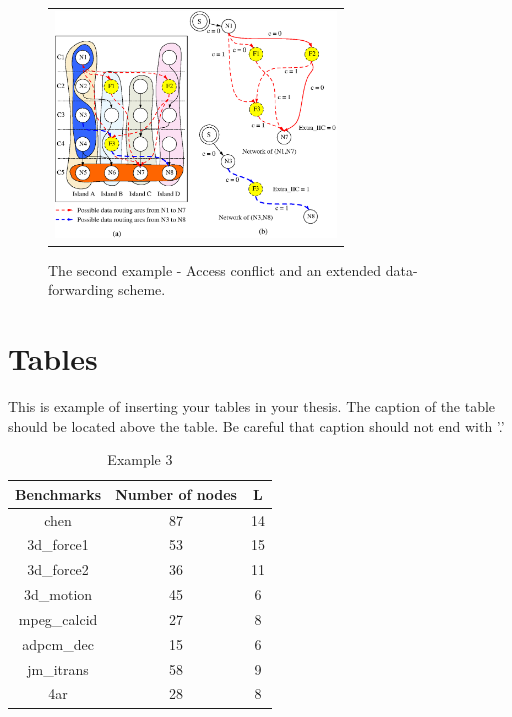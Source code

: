 \documentclass[doctor]{snuee}
\begin{document}
\begin{figure}[htbp]
	{
		\begin{center}
			\begin{tabular}{c}
				\includegraphics[height=6cm]{Sample.eps}
			\end{tabular}
		\end{center}
	}
	\caption{The second example - Access conflict and an extended
		data-forwarding scheme. }
\end{figure}
\newpage

\section{Tables}
This is example of inserting your tables in your thesis. The
caption of the table should be located above the table. Be
careful that caption should not end with '.'
\begin{table}[htbp]
	\begin{center}
		\caption{Example 3} \label{tab1}
		\begin{tabular}{|c|c|c|} \hline
			Benchmarks & Number of nodes  & L\\ \hline
			\hline {\sc chen} & 87  & 14\\ \hline {\sc 3d\_force1} & 53  & 15\\
			\hline {\sc 3d\_force2} & 36  & 11\\ \hline {\sc 3d\_motion} & 45  &
			6\\ \hline {\sc mpeg\_calcid} & 27  & 8\\ \hline {\sc adpcm\_dec} &
			15  & 6 \\ \hline {\sc jm\_itrans} & 58  & 9\\ \hline {\sc 4ar} & 28
			& 8\\ \hline
		\end{tabular}
	\end{center}
\end{table}
\end{document}
